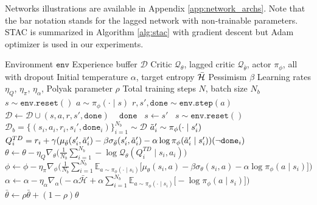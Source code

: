 \documentclass{article}
\begin{document}
Networks illustrations are available in Appendix \ref{app:network_archs}. Note that the bar notation stands for the lagged network with non-trainable parameters. STAC is summarized in Algorithm \ref{alg:stac} with gradient descent but Adam optimizer \citep{kingma2014adam} is used in our experiments. 

\begin{algorithm}
	\caption{Stochastic Actor-Critic}
	\label{alg:stac}
	\begin{algorithmic}
		\Require Environment $\texttt{env}$ 
		\Require Experience buffer $\mathcal{D}$ 
		\Require Critic $\mathcal{Q}_{\theta}$, lagged critic $\mathcal{Q}_{\bar{\theta}}$, actor $\pi_{\phi}$, all with dropout 
		\Require Initial temperature $\alpha$, target entropy $\Bar{\mathcal{H}}$  
		\Require Pessimism $\beta$ 
		\Require Learning rates $\eta_{Q}$, $\eta_{\pi}$, $\eta_{\alpha}$, Polyak parameter $\rho$
		\Require Total training steps $N$, batch size $N_b$
		\State $s \sim \texttt{env.reset}()$ 
		\State $a \sim \pi_{\phi}(\cdot \mid s)$  
		\State $r, s', \texttt{done} \sim \texttt{env.step}(a)$ 
		\State $\mathcal{D} \leftarrow \mathcal{D} \cup (s, a, r, s', \texttt{done})$  
		\State \algorithmicif\ $\texttt{~done}$ \algorithmicthen\ $s \leftarrow s'$ \algorithmicelse\ $s \sim \texttt{env.reset}() $  
		\State $\mathcal{D}_b = \{(s_i, a_i, r_i, s_i', \texttt{done}_i)\}_{i=1}^{N_b}  \sim  \mathcal{D} $  
		\State $\Tilde{a}_{i}'\sim\pi_{\phi}(\cdot \mid s_i')$ 
		\State $Q_i^{TD} = r_i + \gamma (\mu_{\bar{\theta}}(s_i', \Tilde{a}_{i}') - \beta \sigma_{\bar{\theta}}(s_i', \Tilde{a}_{i}') -\alpha \log \pi_{\phi}(\Tilde{a}_{i}' \mid s_i') ) (\neg\texttt{done}_i)$ 
		\State $\theta \leftarrow \theta - \eta_{Q} \nabla_{\theta} \Big( \frac{1}{N_{b}} \sum_{i=1}^{N_b}  - \log{\mathcal{Q}_{\theta} (Q_i^{TD} \mid s_i,a_i)} \Big) $ 
		\State $\phi \leftarrow \phi - \eta_{\pi} \nabla_{\phi} \Big( \frac{1}{N_{b}} \sum_{i=1}^{N_b} \mathbb{E}_{a\sim\pi_{\phi}(\cdot \mid s_i)} \big[ \mu_{\theta}(s_i, a) - \beta \sigma_{\theta}(s_i, a) - \alpha \log{\pi_{\phi}(a \mid s_i)} \big] \Big) $  
		\State $\alpha \leftarrow \alpha - \eta_{\alpha} \nabla_{\alpha} \Big( - \alpha \mathcal{\bar{H}} + \alpha \sum_{i=1}^{N_b} \mathbb{E}_{a\sim\pi_{\phi}(\cdot \mid s_i)} \big[ -\log \pi_{\phi}(a \mid s_i) \big] \Big) $  
		\State $\bar{\theta} \leftarrow \rho \bar{\theta} + (1-\rho) \theta $  
		\EndFor
		\EndFor
		
	\end{algorithmic}
\end{algorithm}
\end{document}
